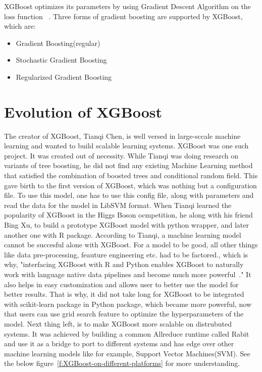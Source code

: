 XGBoost optimizes its parameters by using Gradient Descent Algorithm on the loss
function ~\cite{hid-sp18-401-XGBoost-MLmastery}. Three forms of gradient
boosting  are supported by XGBoost, which are:

\begin{itemize}
\item Gradient Boosting(regular)
\item Stochastic Gradient Boosting
\item Regularized Gradient Boosting 
\end{itemize}

\section{Evolution of XGBoost} 

The creator of XGBoost, Tianqi Chen, is well versed in large-sccale machine
learning and wanted to build scalable learning systems. XGBoost was one such
project. It was created out of necessity. While Tianqi was doing research on
variants of tree boosting, he did not find any existing Machine Learning
method that satisfied the  combination of boosted trees and conditional random
field. This gave birth to the first version of XGBoost, which was nothing but
a configuration file. To use this model,  one has to use this config file,
along with parameters and read the data for the model in LibSVM format. When
Tianqi learned the popularity of XGBoost in the Higgs Boson ocmpetition, he
along with his friend Bing Xu, to build a prototype XGBoost model with python
wrapper, and later another one with R package. According to Tianqi, a machine
learning model cannot be succesful alone with XGBoost. For a model to be good,
all other things like data pre-processing, feauture engineering etc. had to be
factored., which is why, "interfacing XGBoost with R and Python enables
XGBoost to naturally work with language native data pipelines and become much
more powerful~\cite{hid-sp18-401-XGBoost-evolution}." It also helps in easy
customization and allows user to better use the model for better results. That
is why, it did not take long for XGBoost to be integrated with scikit-learn
package in Python package, which became more powerful, now that users can use
grid search feature to optimize the hyperparameters of the model. Next thing
left, is to make XGBoost more scalable on distrubuted systems. It was achieved
by building a common Allreduce runtime called Rabit and use it as a bridge to
port to different systems and  has edge over other machine learning models
like for example, Support Vector Machines(SVM).
See the below figure~\ref{f:XGBoost-on-different-platforms} for more
understanding.


